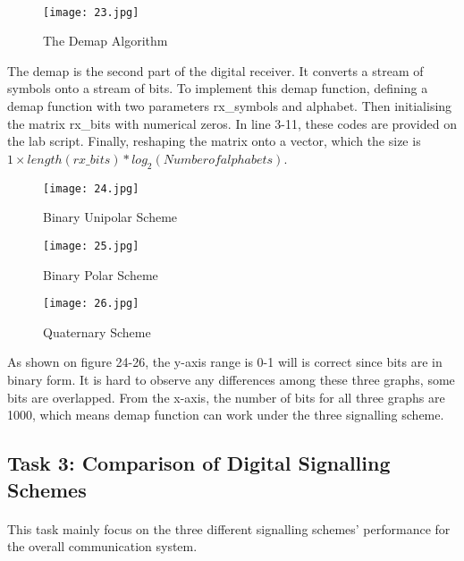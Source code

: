 \documentclass[12pt]{article}
\begin{document}
    \paragraph{}
    \begin{figure}[H]
    \centering
    \texttt{[image: 23.jpg]}
    \caption{The Demap Algorithm}
    \end{figure}
    The demap is the second part of the digital receiver. It converts a stream of symbols onto a stream of bits. To implement this demap function, defining a demap function with two parameters rx\_symbols and alphabet. Then initialising the matrix rx\_bits with numerical zeros. In line 3-11, these codes are provided on the lab script. Finally, reshaping the matrix onto a vector, which the size is $1 \times length(rx\_bits)*log_2(Number of alphabets)$.
    \begin{figure}[htbp]
    \begin{minipage}[t]{0.3\linewidth}
    \centering
    \texttt{[image: 24.jpg]}
    \caption{Binary Unipolar Scheme}
    \label{fig:side:a}
    \end{minipage}
    \begin{minipage}[t]{0.3\linewidth}
    \centering
    \texttt{[image: 25.jpg]}
    \caption{Binary Polar Scheme}
    \end{minipage}
    \begin{minipage}[t]{0.3\linewidth}
    \centering
    \texttt{[image: 26.jpg]}
    \caption{Quaternary Scheme}
    \label{}
    \end{minipage}
    \end{figure}
    As shown on figure 24-26, the y-axis range is 0-1 will is correct since bits are in binary form. It is hard to observe any differences among these three graphs, some bits are overlapped. From the x-axis, the number of bits for all three graphs are 1000, which means demap function can work under the three signalling scheme.
    
    
    \subsection{Task 3: Comparison of Digital Signalling Schemes}
    \paragraph{}
    This task mainly focus on the three different signalling schemes' performance for the overall communication system.
\end{document}
